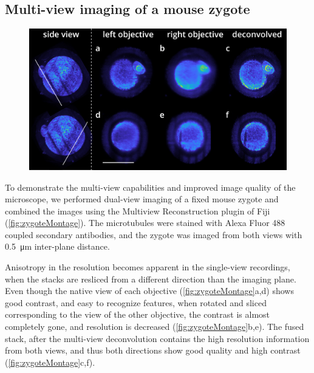   \subsection{Multi-view imaging of a mouse zygote}
    \begin{figure}[ptb]
      \centering
      \includegraphics[width=1\textwidth]{zygoteMontage}
      \label{fig:zygoteMontage}
    \end{figure}

    To demonstrate the multi-view capabilities and improved image quality of the microscope, we performed dual-view imaging of a fixed mouse zygote and combined the images using the Multiview Reconstruction \cite{preibisch_efficient_2014} plugin of Fiji (\autoref{fig:zygoteMontage}). The microtubules were stained with Alexa Fluor 488 coupled secondary antibodies, and the zygote was imaged from both views with \SI{0.5}{\micro m} inter-plane distance.

    Anisotropy in the resolution becomes apparent in the single-view recordings, when the stacks are resliced from a different direction than the imaging plane. Even though the native view of each objective (\autoref{fig:zygoteMontage}a,d) shows good contrast, and easy to recognize features, when rotated and sliced corresponding to the view of the other objective, the contrast is almost completely gone, and resolution is decreased (\autoref{fig:zygoteMontage}b,e). The fused stack, after the multi-view deconvolution contains the high resolution information from both views, and thus both directions show good quality and high contrast (\autoref{fig:zygoteMontage}c,f).




